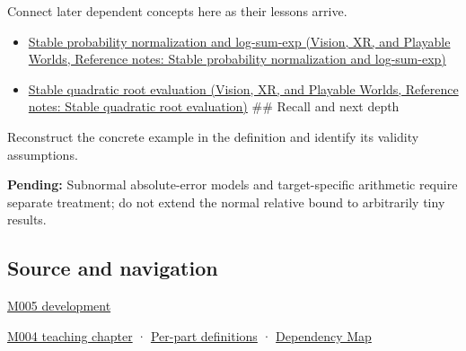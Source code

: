 Connect later dependent concepts here as their lessons arrive.

\begin{itemize}
\tightlist
\item
  \href{../07-Vision-XR-and-Playable-Worlds/main.pdf\#nameddest=appendix-d580b422240f}{Stable probability normalization and log-sum-exp (Vision, XR, and Playable Worlds, Reference notes: Stable probability normalization and log-sum-exp)}
\item
  \href{../07-Vision-XR-and-Playable-Worlds/main.pdf\#nameddest=appendix-b9afba7f63e5}{Stable quadratic root evaluation (Vision, XR, and Playable Worlds, Reference notes: Stable quadratic root evaluation)} \#\# Recall and next depth
\end{itemize}

Reconstruct the concrete example in the definition and identify its validity assumptions.

\textbf{Pending:} Subnormal absolute-error models and target-specific arithmetic require separate treatment; do not extend the normal relative bound to arbitrarily tiny results.

\subsection{Source and navigation}\label{appendix-bc44f7b42f42-source-and-navigation}

\hyperref[01-foundations-i-ch001-when-arithmetic-meets-uncertainty]{M005 development}

\hyperref[01-foundations-i-ch001-a-stretching-ruler-for-real-valued-quantities]{M004 teaching chapter} · \hyperref[appendix-fd090d982a15-m004---parts-61-76]{Per-part definitions} · \hyperref[appendix-4ad47bdd269a]{Dependency Map}
